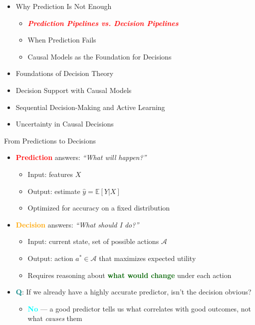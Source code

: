 \documentclass[
  10pt,
  ignorenonframetext,
]{beamer}
\providecommand{\tightlist}{%
  \setlength{\itemsep}{0pt}\setlength{\parskip}{0pt}}
\newcommand{\EE}{\mathbb{E}}
\begin{document}
\begin{frame}{}
\label{section-1}
\begin{itemize}
\tightlist
\item
  Why Prediction Is Not Enough

  \begin{itemize}
  \tightlist
  \item
    \emph{\textbf{\textcolor{red}{Prediction Pipelines vs. Decision Pipelines}}}
  \item
    When Prediction Fails
  \item
    Causal Models as the Foundation for Decisions
  \end{itemize}
\item
  Foundations of Decision Theory
\item
  Decision Support with Causal Models
\item
  Sequential Decision-Making and Active Learning
\item
  Uncertainty in Causal Decisions
\end{itemize}
\end{frame}

\begin{frame}{From Predictions to Decisions}
\label{from-predictions-to-decisions}
\begin{itemize}
\tightlist
\item
  \textbf{\textcolor{red}{Prediction}} answers: \emph{``What will
  happen?''}

  \begin{itemize}
  \tightlist
  \item
    Input: features \(X\)
  \item
    Output: estimate \(\hat{y} = \EE[Y | X]\)
  \item
    Optimized for accuracy on a fixed distribution
  \end{itemize}
\item
  \textbf{\textcolor{orange}{Decision}} answers: \emph{``What should I
  do?''}

  \begin{itemize}
  \tightlist
  \item
    Input: current state, set of possible actions \(\mathcal{A}\)
  \item
    Output: action \(a^* \in \mathcal{A}\) that maximizes expected
    utility
  \item
    Requires reasoning about
    \textbf{\textcolor{darkgreen}{what would change}} under each action
  \end{itemize}
\item
  \textbf{\textcolor{teal}{Q}}: If we already have a highly accurate
  predictor, isn't the decision obvious?

  \begin{itemize}
  \tightlist
  \item
    \textbf{\textcolor{cyan}{No}} --- a good predictor tells us what
    correlates with good outcomes, not what \emph{causes} them
  \end{itemize}
\end{itemize}
\end{frame}
\end{document}
